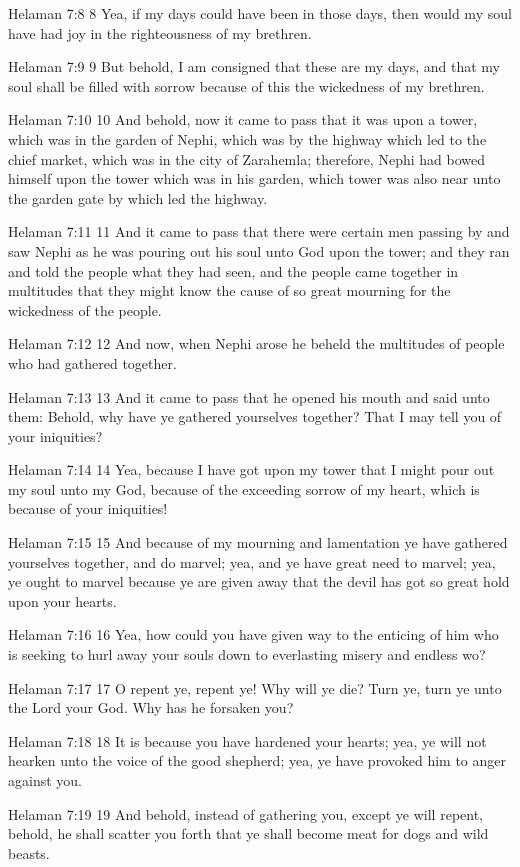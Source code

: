 Helaman 7:8
 8 Yea, if my days could have been in those days, then would my
soul have had joy in the righteousness of my brethren.

Helaman 7:9
 9 But behold, I am consigned that these are my days, and that my
soul shall be filled with sorrow because of this the wickedness
of my brethren.

Helaman 7:10
 10 And behold, now it came to pass that it was upon a tower,
which was in the garden of Nephi, which was by the highway which
led to the chief market, which was in the city of Zarahemla;
therefore, Nephi had bowed himself upon the tower which was in
his garden, which tower was also near unto the garden gate by
which led the highway.

Helaman 7:11
 11 And it came to pass that there were certain men passing by
and saw Nephi as he was pouring out his soul unto God upon the
tower; and they ran and told the people what they had seen, and
the people came together in multitudes that they might know the
cause of so great mourning for the wickedness of the people.

Helaman 7:12
 12 And now, when Nephi arose he beheld the multitudes of people
who had gathered together.

Helaman 7:13
 13 And it came to pass that he opened his mouth and said unto
them: Behold, why have ye gathered yourselves together? That I
may tell you of your iniquities?

Helaman 7:14
 14 Yea, because I have got upon my tower that I might pour out
my soul unto my God, because of the exceeding sorrow of my heart,
which is because of your iniquities!

Helaman 7:15
 15 And because of my mourning and lamentation ye have gathered
yourselves together, and do marvel; yea, and ye have great need
to marvel; yea, ye ought to marvel because ye are given away that
the devil has got so great hold upon your hearts.

Helaman 7:16
 16 Yea, how could you have given way to the enticing of him who
is seeking to hurl away your souls down to everlasting misery and
endless wo?

Helaman 7:17
 17 O repent ye, repent ye! Why will ye die? Turn ye, turn ye
unto the Lord your God. Why has he forsaken you?

Helaman 7:18
 18 It is because you have hardened your hearts; yea, ye will not
hearken unto the voice of the good shepherd; yea, ye have
provoked him to anger against you.

Helaman 7:19
 19 And behold, instead of gathering you, except ye will repent,
behold, he shall scatter you forth that ye shall become meat for
dogs and wild beasts.

